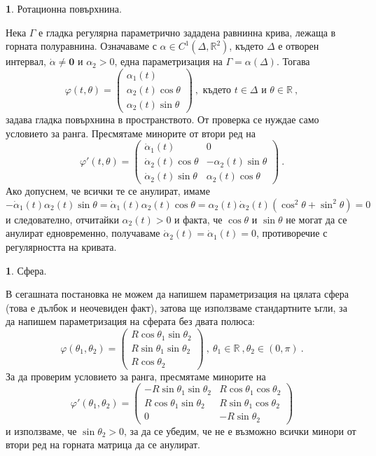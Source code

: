 \documentclass[11pt]{article}
\numberwithin{equation}{section}
\numberwithin{figure}{section}
\numberwithin{table}{section}
\theoremstyle{plain}
\theoremstyle{definition}
\theoremstyle{remark}
\theoremstyle{definition}
\theoremstyle{remark}
\theoremstyle{plain}
\theoremstyle{definition}
\theoremstyle{definition}
\newtheorem{example}[thm]{\protect\examplename}
\theoremstyle{plain}
\theoremstyle{plain}
\theoremstyle{plain}
\theoremstyle{definition}
\theoremstyle{plain}
\providecommand{\examplename}{Пример}
\renewcommand*{\Vec}[1]{\mathbf{#1}}
\newcommand*{\Z}{\Vec{0}}
\newcommand*{\R}{\mathbb{R}}
\begin{document}
\begin{example} \label{surface_of_revolution} Ротационна повърхнина.

Нека $\Gamma$ е гладка регулярна параметрично зададена равнинна крива, лежаща в горната полуравнина. Означаваме с $\alpha\in C^1(\Delta , \R^2)$, където $\Delta$ е отворен интервал, $\dot\alpha \not = \Z$ и $\alpha_2 >0$, една параметризация на
$\Gamma=\alpha(\Delta)$. Тогава
$$\varphi(t,\theta)=\left( \begin{array}{c}\alpha_1(t)\\ \alpha_2(t)\cos \theta\\ \alpha_2(t)\sin \theta\end{array}\right) \ ,  \mbox{ където }t\in \Delta \mbox{ и } \theta\in \R \ ,$$
задава гладка повърхнина в пространството. От проверка се нуждае само условието за ранга. Пресмятаме минорите от втори ред на
$$\varphi'(t,\theta)=\left( \begin{array}{cc}\dot\alpha_1(t)&0 \\ \dot\alpha_2(t)\cos \theta & -\alpha_2(t)\sin \theta\\ \dot\alpha_2(t)\sin \theta&\alpha_2(t)\cos \theta
\end{array}\right) \ .$$
Ако допуснем, че всички те се анулират, имаме
$$-\dot\alpha_1(t)\alpha_2(t)\sin \theta=\dot\alpha_1(t)\alpha_2(t)\cos
 \theta=\alpha_2(t)\dot\alpha_2(t)(\cos^2\theta+\sin^2\theta
 )=0$$
 и следователно, отчитайки $\alpha_2(t) >0$ и факта, че $\cos \theta$ и $\sin \theta$ не могат да се анулират едновременно, получаваме $\dot\alpha_2(t)=\dot\alpha_1(t)=0$, противоречие с регулярността на кривата.
 \end{example}

\begin{example} \label{sphere} Сфера.

В сегашната постановка не можем да напишем параметризация на цялата сфера (това е дълбок и неочевиден факт), затова ще използваме стандартните ъгли, за да напишем параметризация на сферата без двата полюса:
$$\varphi(\theta_1,\theta_2)=\left( \begin{array}{c}R\cos\theta_1 \sin\theta_2 \\ R\sin\theta_1 \sin\theta_2\\ R\cos\theta_2\end{array}\right) \ , \ \theta_1\in \R \ , \theta_2\in (0,\pi) \ .$$
За да проверим условието за ранга, пресмятаме минорите на
$$\varphi'(\theta_1,\theta_2)=\left( \begin{array}{cc} -R\sin\theta_1 \sin\theta_2&R\cos\theta_1 \cos\theta_2 \\ R\cos\theta_1 \sin\theta_2 & R\sin\theta_1 \cos\theta_2\\ 0& -R\sin\theta_2
\end{array}\right)$$ и използваме, че $\sin\theta_2>0$, за да се убедим, че не е възможно всички минори от втори ред на горната матрица да се анулират.
\end{example}
\end{document}
